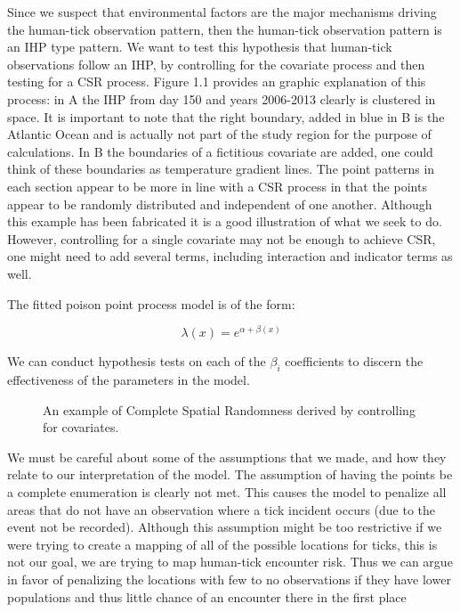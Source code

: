 \noindent Since we suspect that environmental factors are the major mechanisms driving the human-tick observation pattern, then the human-tick observation pattern is an IHP type pattern. We want to test this hypothesis  that human-tick observations follow an IHP, by controlling for the covariate process and then testing for a CSR process. Figure 1.1 provides an graphic explanation of this process: in A the IHP from day 150 and years 2006-2013 clearly is clustered in space. It is important to note that the right boundary, added in blue in B is the Atlantic Ocean and is actually not part of the study region for the purpose of calculations. In B the boundaries of a fictitious covariate are added, one could think of these boundaries as temperature gradient lines. The point patterns in each section appear to be more in line with a CSR process in that the points appear to be randomly distributed and independent of one another. Although this example has been fabricated it is a good illustration of what we seek to do. However, controlling for a single covariate may not be enough to achieve CSR, one might need to add several terms, including interaction and indicator terms as well.\newline
 
 
\noindent The fitted poison point process model is of the form:

\begin{equation}
\lambda(x) = e^{\alpha +\beta(x)}
\end{equation}

\noindent We can conduct hypothesis tests on each of the $\beta_i$ coefficients to discern the effectiveness of the parameters in the model. \newline


\begin{figure} [t]
\centerline{}
\caption{An example of Complete Spatial Randomness derived by controlling for covariates. }
\label{fig6}
\end{figure}

\noindent We must be careful about some of the assumptions that we made, and how they relate to our interpretation of the model. The assumption of having the points be a complete enumeration is clearly not met. This causes the model to penalize all areas that do not have an observation where a tick incident occurs (due to the event not be recorded). Although this assumption might be too restrictive if we were trying to create a mapping of all of the possible locations for ticks, this is not our goal, we are trying to map human-tick encounter risk. Thus we can argue in favor of penalizing the locations with few to no observations if they have lower populations and thus little chance of an encounter there in the first place\newline


